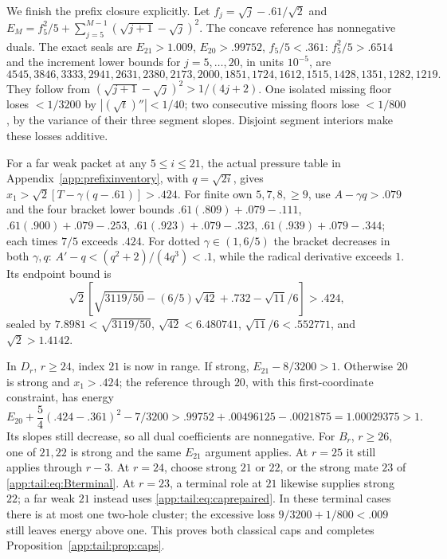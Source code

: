 \documentclass[11pt]{article}
\theoremstyle{definition}
\theoremstyle{remark}
\begin{document}
We finish the prefix closure explicitly. Let
$f_j=\sqrt j-.61/\sqrt2$ and
$E_M=f_5^2/5+\sum_{j=5}^{M-1}(\sqrt{j+1}-\sqrt j)^2$.
The concave reference has nonnegative duals. The exact seals are
$E_{21}>1.009$, $E_{20}>.99752$, $f_5/5<.361$:
$f_5^2/5>.6514$ and the increment lower bounds for $j=5,\ldots,20$,
in units $10^{-5}$, are
\[
4545,3846,3333,2941,2631,2380,2173,2000,
1851,1724,1612,1515,1428,1351,1282,1219.
\]
They follow from $(\sqrt{j+1}-\sqrt j)^2>1/(4j+2)$.
One isolated missing floor loses $<1/3200$ by
$|(\sqrt t)''|<1/40$; two consecutive missing floors lose
$<1/800$, by the variance of their three segment slopes.
Disjoint segment interiors make these losses additive.

For a far weak packet at any $5\le i\le21$, the actual pressure
table in Appendix~\ref{app:prefixinventory}, with $q=\sqrt{2i}$, gives
$x_1>\sqrt2[T-\gamma(q-.61)]>.424$.
For finite own $5,7,8,\ge9$, use $A-\gamma q>.079$ and the
four bracket lower bounds
$ .61(.809)+.079-.111$,
$ .61(.900)+.079-.253$,
$ .61(.923)+.079-.323$,
$ .61(.939)+.079-.344$; each times $7/5$ exceeds $.424$.
For dotted $\gamma\in(1,6/5)$ the bracket decreases in both
$\gamma,q$: $A'-q<(q^2+2)/(4q^3)<.1$, while the radical
derivative exceeds $1$. Its endpoint bound is
\[
 \sqrt2[\sqrt{3119/50}-(6/5)\sqrt{42}+.732-\sqrt{11}/6]>.424,
\]
sealed by $7.8981<\sqrt{3119/50}$, $\sqrt{42}<6.480741$,
$\sqrt{11}/6<.552771$, and $\sqrt2>1.4142$.

In $D_r$, $r\ge24$, index $21$ is now in range. If strong,
$E_{21}-8/3200>1$. Otherwise $20$ is strong and $x_1>.424$;
the reference through $20$, with this first-coordinate constraint,
has energy
\begin{equation}\label{app:tail:eq:caprepaired}
 E_{20}+\frac54(.424-.361)^2-7/3200
 >.99752+.00496125-.0021875=1.00029375>1.
\end{equation}
Its slopes still decrease, so all dual coefficients are nonnegative.
For $B_r$, $r\ge26$, one of $21,22$ is strong and the same
$E_{21}$ argument applies. At $r=25$ it still applies through
$r-3$. At $r=24$, choose strong $21$ or $22$, or the strong mate
$23$ of \eqref{app:tail:eq:Bterminal}. At $r=23$, a terminal role at $21$
likewise supplies strong $22$; a far weak $21$ instead uses
\eqref{app:tail:eq:caprepaired}. In these terminal cases there is at most
one two-hole cluster; the excessive loss $9/3200+1/800<.009$
still leaves energy above one. This proves both classical caps and
completes Proposition~\ref{app:tail:prop:caps}.
\end{document}
